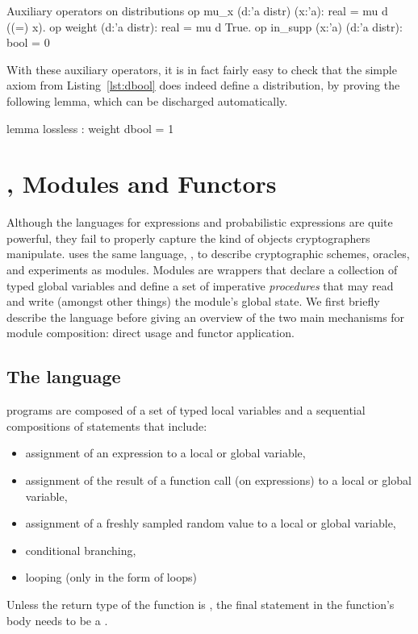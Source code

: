 \begin{easycrypt}[label={lst:mu_aux}]{Auxiliary operators on distributions}
op mu_x (d:'a distr) (x:'a): real = mu d ((=) x).
op weight (d:'a distr): real = mu d True.
op in_supp (x:'a) (d:'a distr): bool = 0%
\end{easycrypt}

With these auxiliary operators, it is in fact fairly easy to check that the
simple axiom from Listing~\ref{lst:dbool} does indeed define a distribution, by
proving the following lemma, which can be discharged automatically.

\begin{easycrypt}[]{}
lemma lossless : weight dbool = 1%
\end{easycrypt}

\section{\pWHILE, Modules and Functors\label{sec:modules}}
Although the languages for expressions and probabilistic expressions are quite
powerful, they fail to properly capture the kind of objects cryptographers
manipulate. \EasyCrypt uses the same language, \pWHILE, to describe
cryptographic schemes, oracles, and experiments as modules. Modules are
wrappers that declare a collection of typed global variables and define a set
of imperative \emph{procedures} that may read and write (amongst other things)
the module's global state. We first briefly describe the \pWHILE language before
giving an overview of the two main mechanisms for module composition: direct
usage and functor application.

\subsection{The \pWHILE language}
\pWHILE programs are composed of a set of typed local variables and a
sequential compositions of statements that include:
\begin{itemize}\itemsep-.5em
\item assignment of an expression to a local or global variable,
\item assignment of the result of a function call (on expressions) to a local
  or global variable,
\item assignment of a freshly sampled random value to a local or global
  variable,
\item conditional branching,
\item looping (only in the form of  loops)
\end{itemize}
Unless the return type of the function is , the final statement in
the function's body needs to be a .

